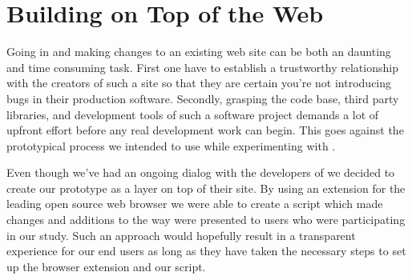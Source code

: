 \section{Building on Top of the Web}
\label{section:building.on.top.of.the.web}

Going in and making changes to an existing web site can be both an
daunting and time consuming task. First one have to establish a trustworthy
relationship with the creators of such a site so that they are certain
you're not introducing bugs in their production software. Secondly, grasping
the code base, third party libraries, and development tools of such a software
project demands a lot of upfront effort before any real development work can
begin. This goes against the prototypical process we intended to use while
experimenting with \urort{}.

Even though we've had an ongoing dialog with the developers of \urort{} we
decided to create our prototype as a layer on top of their site.
By using an
extension
for the leading open source%
web browser we were able to create a script which
made changes and additions to the way \urort{}
were presented to users who were participating in our study.
Such an approach would hopefully result in a transparent experience for our
end users as long as they have taken the necessary steps to set up the browser
extension and our script.

